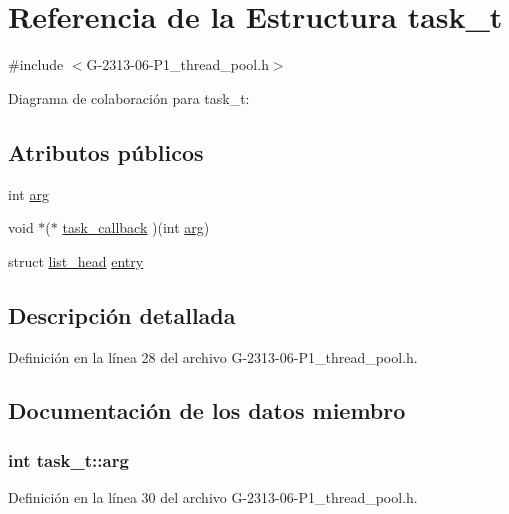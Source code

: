 \hypertarget{structtask__t}{}\section{Referencia de la Estructura task\+\_\+t}
\label{structtask__t}


{\ttfamily \#include $<$G-\/2313-\/06-\/\+P1\+\_\+thread\+\_\+pool.\+h$>$}



Diagrama de colaboración para task\+\_\+t\+:
\subsection*{Atributos públicos}
\begin{DoxyCompactItemize}
\item 
int \hyperlink{structtask__t_a9162b404bd1cf5349b2092f69e31c613}{arg}
\item 
void $\ast$($\ast$ \hyperlink{structtask__t_ac8c2d416888e415fc6ee54410a4c511c}{task\+\_\+callback} )(int \hyperlink{structtask__t_a9162b404bd1cf5349b2092f69e31c613}{arg})
\item 
struct \hyperlink{structlist__head}{list\+\_\+head} \hyperlink{structtask__t_ac812553758f9102a7a674ad29e78f98b}{entry}
\end{DoxyCompactItemize}


\subsection{Descripción detallada}


Definición en la línea 28 del archivo G-\/2313-\/06-\/\+P1\+\_\+thread\+\_\+pool.\+h.



\subsection{Documentación de los datos miembro}
\subsubsection[{\texorpdfstring{arg}{arg}}]{\setlength{\rightskip}{0pt plus 5cm}int task\+\_\+t\+::arg}\hypertarget{structtask__t_a9162b404bd1cf5349b2092f69e31c613}{}\label{structtask__t_a9162b404bd1cf5349b2092f69e31c613}


Definición en la línea 30 del archivo G-\/2313-\/06-\/\+P1\+\_\+thread\+\_\+pool.\+h.

